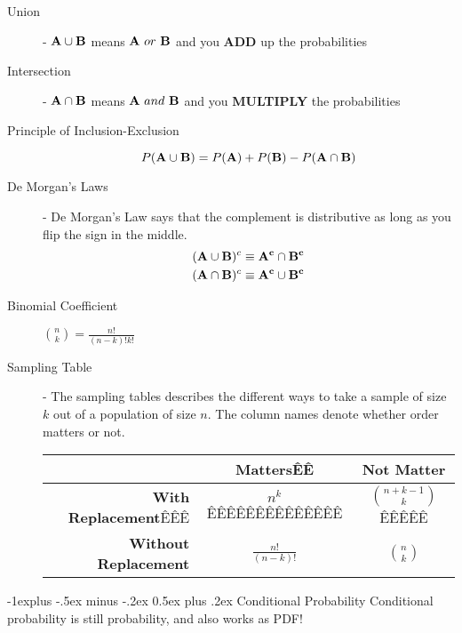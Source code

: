 \documentclass[10pt,landscape]{article}
\makeatletter
\theoremstyle{definition}
\renewcommand{\subsection}{\@startsection{subsection}{2}{0mm}%
                                {-1explus -.5ex minus -.2ex}%
                                {0.5ex plus .2ex}%
                                {\normalfont\normalsize\bfseries}}
\makeatother
\begin{document}
\begin{multicols}{3}
\begin{description}
        \item[Union] - ${\bf A} \cup {\bf B}$ means ${\bf A}\ or\ {\bf B}$ and you \textbf{ADD} up the probabilities 
        \item[Intersection] - ${\bf A} \cap {\bf B}$ means ${\bf A}\ and \ {\bf B}$ and you \textbf{MULTIPLY} the probabilities 
        \item[Principle of Inclusion-Exclusion]
        \[ P ({\bf A} \cup {\bf B}) = P({\bf A}) + P({\bf B}) - P({\bf A} \cap {\bf B}) \]
	   \item[De Morgan's Laws] - De Morgan's Law says that the complement is distributive as long as you flip the sign in the middle.
           \begin{align*} 
        ({\bf A} \cup {\bf B})^c \equiv {\bf A^c} \cap {\bf B^c} \\
        ({\bf A} \cap {\bf B})^c \equiv {\bf A^c} \cup {\bf B^c}
           \end{align*} 
    \item[Binomial Coefficient] $\binom{n}{k} = \frac{n!}{(n-k)!k!}$
    \item[Sampling Table] - The sampling tables describes the different ways to take a sample of size $k$ out of a population of size $n$. The column names denote whether order matters or not.\\
        \begin{center}
            \begin{tabular}{r|cc}
                 & \textbf{Matters}ÊÊ & \textbf{Not Matter} \\ \hline
                \textbf{With Replacement}ÊÊÊ & $\displaystyle n^k$ÊÊÊÊÊÊÊÊÊÊÊÊÊÊ & $\displaystyle{n+k-1 \choose k}$ÊÊÊÊÊ \\ 
                \textbf{Without Replacement} & $\displaystyle\frac{n!}{(n - k)!}$ & $\displaystyle{n \choose k}$
            \end{tabular}
        \end{center}
\end{description}
\subsection{Conditional Probability}
Conditional probability is still probability, and also works as PDF!
    \begin{description}
       

\end{description}
\end{multicols}
\end{document}
